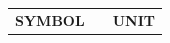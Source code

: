 \documentclass[12pt,oneside,openright,a4paper]{cpe-english-project}
\begin{document}
\listoffigures                      
\listofsymbols
\begin{flushleft}
\begin{tabular}{@{}p{}p{}p{}}
\textbf{SYMBOL}  & & \textbf{UNIT} \\[0.2cm]
\end{tabular}
\end{flushleft}
\listofvocab
\end{document}
